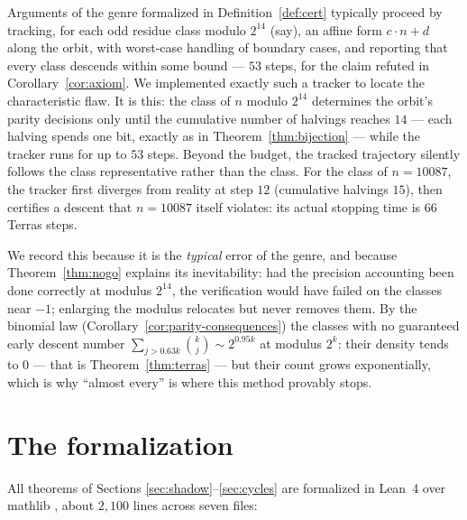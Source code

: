 \documentclass[11pt]{article}
\begin{document}
Arguments of the genre formalized in Definition~\ref{def:cert}
typically proceed by tracking, for each odd residue class modulo
$2^{14}$ (say), an affine form $c \cdot n + d$ along the orbit, with
worst-case handling of boundary cases, and reporting that every class
descends within some bound --- $53$ steps, for the claim refuted in
Corollary~\ref{cor:axiom}. We implemented exactly such a tracker to
locate the characteristic flaw. It is this: the class of $n$ modulo
$2^{14}$ determines the orbit's parity decisions only until the
cumulative number of halvings reaches $14$ --- each halving spends one
bit, exactly as in Theorem~\ref{thm:bijection} --- while the tracker
runs for up to $53$ steps. Beyond the budget, the tracked trajectory
silently follows the class representative rather than the class. For
the class of $n = 10087$, the tracker first diverges from reality at
step $12$ (cumulative halvings $15$), then certifies a descent that
$n = 10087$ itself violates: its actual stopping time is $66$ Terras
steps.

We record this because it is the \emph{typical} error of the genre,
and because Theorem~\ref{thm:nogo} explains its inevitability: had the
precision accounting been done correctly at modulus $2^{14}$, the
verification would have failed on the classes near $-1$; enlarging the
modulus relocates but never removes them. By the binomial law
(Corollary~\ref{cor:parity-consequences}) the classes with no
guaranteed early descent number $\sum_{j > 0.63k}\binom{k}{j} \sim
2^{0.95k}$ at modulus $2^k$: their density tends to $0$ --- that is
Theorem~\ref{thm:terras} --- but their count grows exponentially,
which is why ``almost every'' is where this method provably stops.

\section{The formalization}\label{sec:formal}

All theorems of Sections \ref{sec:shadow}--\ref{sec:cycles} are
formalized in Lean~4 over \textsf{mathlib} \cite{mathlib}, about
$2{,}100$ lines across seven files:
\end{document}
